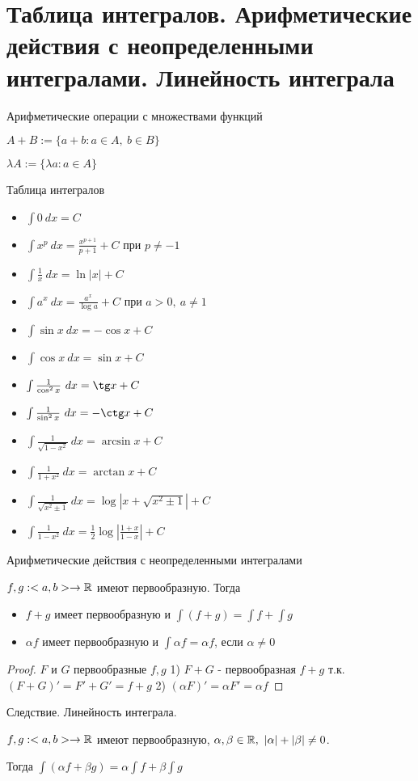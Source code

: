 \section{Таблица интегралов. Арифметические действия с неопределенными интегралами. Линейность интеграла \href{https://youtu.be/p9C57KDo1Yg?t=4373}{\Walley}}
\begin{conj}
    Арифметические операции с множествами функций

    $A+B := \{a+b: a \in A,\ b \in B\}$

    $\lambda A := \{ \lambda a : a \in A\}$
\end{conj}

Таблица интегралов

\begin{itemize}
    \item $\int 0\ dx = C$
    \item $\int x^p\ dx = \frac{x^{p+1}}{p+1} + C$ при $p \neq -1$
    \item $\int \frac{1}{x}\ dx = \ln |x| + C$
    \item $\int a^x\ dx = \frac{a^x}{\log a} + C$ при $a>0,\ a\neq 1$
    \item $\int \sin x\ dx = -\cos x + C$
    \item $\int \cos x\ dx = \sin x + C$
    \item $\int \frac{1}{\cos^2 x}\ dx = \tg x + C$
    \item $\int \frac{1}{\sin^2 x}\ dx = -\ctg x + C$
    \item $\int \frac{1}{\sqrt{1-x^2}}\ dx = \arcsin x + C$
    \item $\int \frac{1}{1+x^2}\ dx = \arctan x + C$
    \item $\int \frac{1}{\sqrt{x^2\pm 1}}\ dx = \log|x+\sqrt{x^2\pm 1}| + C$
    \item $\int \frac{1}{1-x^2}\ dx = \frac{1}{2}\log |\frac{1+x}{1-x}| + C$   
\end{itemize}

\begin{conj}
    Арифметические действия с неопределенными интегралами

    $f, g:<a, b> \to \mathbb{R}$ имеют первообразную. Тогда
    \begin{itemize}
        \item $f+g$ имеет первообразную и $\int(f+g) = \int f + \int g$
        \item $\alpha f$ имеет первообразную и $\int \alpha f = \alpha f$, если $\alpha \neq 0$
    \end{itemize}
\end{conj}

\begin{proof}
    $F$ и $G$ первообразные $f, g$
    1) $F+G$ - первообразная $f+g$ т.к. $(F+G)'=F'+G'=f+g$
    2) $(\alpha F)' = \alpha F' = \alpha f$
\end{proof}

Следствие. Линейность интеграла.

$f, g: <a, b> \to \mathbb{R}$ имеют первообразную, $\alpha, \beta \in \R,\ |\alpha|+|\beta|\neq 0$.

Тогда $\int (\alpha f + \beta g) = \alpha \int f + \beta \int g$